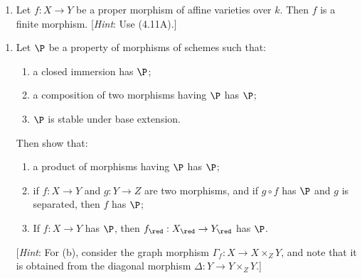 \documentclass[12pt]{amsart}
\begin{document}
\begin{enumerate}
  \item[4.6.] {
      Let $f:X\to Y$ be a proper morphism of affine varieties over $k$.
      Then $f$ is a finite morphism. [\emph{Hint}: Use (4.11A).]
    }
\end{enumerate}


\begin{enumerate}
  \item[4.8.] {
      Let $\P$ be a property of morphisms of schemes such that:
      \begin{enumerate}[label=(\roman*)]
        \item a closed immersion has $\P$;
        \item a composition of two morphisms having $\P$ has $\P$;
        \item $\P$ is stable under base extension.
      \end{enumerate}
      Then show that:
      \begin{enumerate}
        \item a product of morphisms having $\P$ has $\P$;
        \item if $f:X\to Y$ and $g:Y\to Z$ are two morphisms, and if $g\circ f$ has $\P$ and $g$ is separated, then $f$ has $\P$;
        \item If $f:X\to Y$ has $\P$, then $f_{\red}:X_\red\to Y_\red$ has $\P$.
      \end{enumerate}

      [\emph{Hint}: For (b), consider the graph morphism $\Gamma_f:X\to X\times_Z Y$, and note that it is obtained from the diagonal morphism $\Delta:Y\to Y\times_ZY$.]
    }
\end{enumerate}
\end{document}
